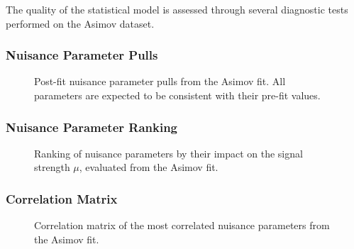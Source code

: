 The quality of the statistical model is assessed through several diagnostic
tests performed on the Asimov dataset.

\subsubsection{Nuisance Parameter Pulls}


\begin{figure}[htbp]
  \centering
  \caption{Post-fit nuisance parameter pulls from the Asimov fit.
           All parameters are expected to be consistent with their
           pre-fit values.}
  \label{fig:np_pulls}
\end{figure}

\subsubsection{Nuisance Parameter Ranking}


\begin{figure}[htbp]
  \centering
  \caption{Ranking of nuisance parameters by their impact on the signal
           strength $\mu$, evaluated from the Asimov fit.}
  \label{fig:np_ranking}
\end{figure}

\subsubsection{Correlation Matrix}


\begin{figure}[htbp]
  \centering
  \caption{Correlation matrix of the most correlated nuisance parameters
           from the Asimov fit.}
  \label{fig:correlation}
\end{figure}

